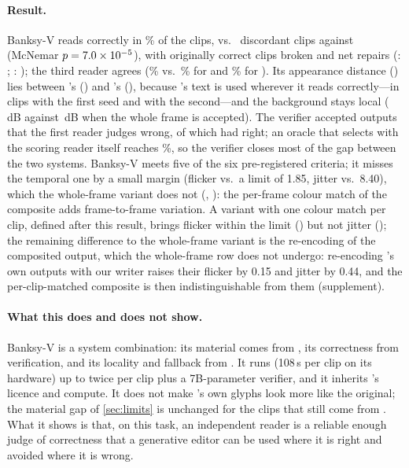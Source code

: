 \paragraph{Result.} Banksy-V reads correctly in \hVRead\% of the clips, \hVOnlySys{} vs.\ \hVOnlyBone{} discordant clips against \method (McNemar $p=7.0\times10^{-5}$), with \hVBroken{} originally correct clips broken and \hVNet{} net repairs (\method: \hBoneNet; \steer: \hSteerNet); the third reader agrees (\hVPix\% vs.\ \hBonePix\% for \method and \hSteerPix\% for \steer). Its appearance distance (\hVMad) lies between \steer's (\hSteerMad) and \method's (\hBoneMad), because \steer's text is used wherever it reads correctly---in \hVChosensteerlocal{} clips with the first seed and \hVChosensteerTwolocal{} with the second---and the background stays local (\hVBG\,dB against \hVWholeBG\,dB when the whole \steer frame is accepted). The verifier accepted \hFalseAccepts{} outputs that the first reader judges wrong, \hFalseAcceptsBone{} of which \method had right; an oracle that selects with the scoring reader itself reaches \hOracleRead\%, so the verifier closes most of the gap between the two systems. Banksy-V meets five of the six pre-registered criteria; it misses the temporal one by a small margin (flicker \hVFlicker{} vs.\ a limit of 1.85, jitter \hVJitter{} vs.\ 8.40), which the whole-frame variant does not (\hVWholeFlicker{}, \hVWholeJitter): the per-frame colour match of the composite adds frame-to-frame variation. A variant with one colour match per clip, defined after this result, brings flicker within the limit (\hVCFlicker) but not jitter (\hVCJitter); the remaining difference to the whole-frame variant is the re-encoding of the composited output, which the whole-frame row does not undergo: re-encoding \steer's own outputs with our writer raises their flicker by 0.15 and jitter by 0.44, and the per-clip-matched composite is then indistinguishable from them (supplement).

\paragraph{What this does and does not show.} Banksy-V is a system combination: its material comes from \steer, its correctness from verification, and its locality and fallback from \method. It runs \steer (108\,s per clip on its hardware) up to twice per clip plus a 7B-parameter verifier, and it inherits \steer's licence and compute. It does not make \method's own glyphs look more like the original; the material gap of \cref{sec:limits} is unchanged for the \hVChosenBOne{} clips that still come from \method. What it shows is that, on this task, an independent reader is a reliable enough judge of correctness that a generative editor can be used where it is right and avoided where it is wrong.

